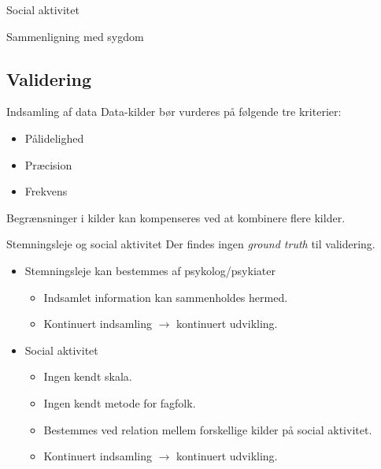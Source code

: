 \begin{frame}{Social aktivitet}
\end{frame}

\begin{frame}{Sammenligning med sygdom}
\end{frame}

\subsection{Validering}
\begin{frame}{Indsamling af data}
Data-kilder bør vurderes på følgende tre kriterier:
\begin{itemize}
\item Pålidelighed
\item Præcision
\item Frekvens
\end{itemize}
Begrænsninger i kilder kan kompenseres ved at kombinere flere kilder.
\end{frame}

\begin{frame}{Stemningsleje og social aktivitet}
Der findes ingen \textit{ground truth} til validering.
\begin{itemize}
\item Stemningsleje kan bestemmes af psykolog/psykiater
\begin{itemize}
\item Indsamlet information kan sammenholdes hermed.
\item Kontinuert indsamling $\rightarrow$ kontinuert udvikling.
\end{itemize}
\item Social aktivitet
\begin{itemize}
\item Ingen kendt skala.
\item Ingen kendt metode for fagfolk.
\item Bestemmes ved relation mellem forskellige kilder på social aktivitet.
\item Kontinuert indsamling $\rightarrow$ kontinuert udvikling.
\end{itemize}
\end{itemize}
\end{frame}


